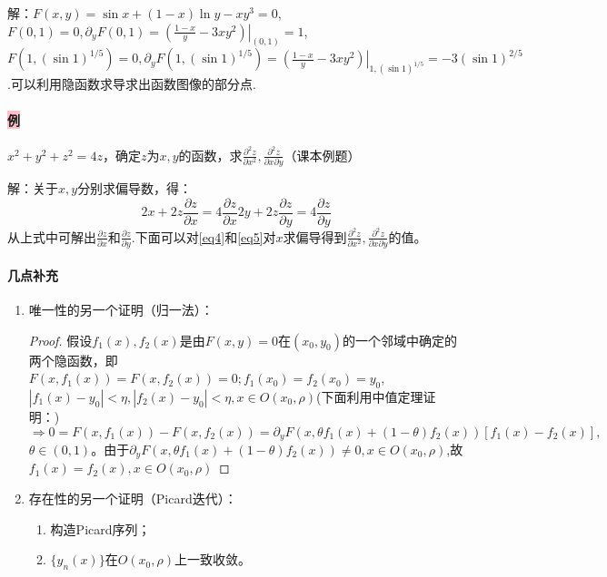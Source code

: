 \documentclass[UTF8]{ctexart}
\begin{document}
        解：$F(x,y)=\sin x+(1-x)\ln y-xy^3=0$,$F(0,1)=0,\partial_yF(0,1)=\left.\left(\frac{1-x}{y}-3xy^2\right)\right|_{(0,1)}=1$,$F(1,(\sin 1)^{1/5})=0,\partial_yF(1,(\sin 1)^{1/5})=\left.\left(\frac{1-x}{y}-3xy^2\right)\right|_{1,(\sin 1)^{1/5}}=-3(\sin 1)^{2/5}$.可以利用隐函数求导求出函数图像的部分点.
        


        \paragraph{\colorbox{pink}{例}}$x^2+y^2+z^2=4z$，确定$z$为$x,y$的函数，求$\frac{\partial^2z}{\partial x^2},\frac{\partial^2z}{\partial x\partial y}$（课本例题）

        解：关于$x,y$分别求偏导数，得：
        \begin{subequations}
            \begin{equation}
            2x+2z\frac{\partial z}{\partial x}=4\frac{\partial z}{\partial x} \label{eq4}
            \end{equation}
            \begin{equation}
            2y+2z\frac{\partial z}{\partial y}=4\frac{\partial z}{\partial y}\label{eq5}
            \end{equation}
        \end{subequations}
        从上式中可解出$\frac{\partial z}{\partial x}$和$\frac{\partial z}{\partial y}$.下面可以对\eqref{eq4}和\eqref{eq5}对$x$求偏导得到$\frac{\partial^2z}{\partial x^2},\frac{\partial^2z}{\partial x\partial y}$的值。



        \paragraph{\colorbox{orange!70}{几点补充}}
        \begin{enumerate}
            \item 唯一性的另一个证明（归一法）：
            \begin{proof}
                假设$f_1(x),f_2(x)$是由$F(x,y)=0$在$(x_0,y_0)$的一个邻域中确定的两个隐函数，即$F(x,f_1(x))=F(x,f_2(x))=0;f_1(x_0)=f_2(x_0)=y_0$,$|f_1(x)-y_0|<\eta,|f_2(x)-y_0|<\eta,x\in O(x_0,\rho)$(下面利用中值定理证明：)
                $$\Rightarrow 0=F(x,f_1(x))-F(x,f_2(x))=\partial_yF(x,\theta f_1(x)+(1-\theta)f_2(x))[f_1(x)-f_2(x)],$$
                $\theta\in(0,1)$。由于$\partial_yF(x,\theta f_1(x)+(1-\theta)f_2(x))\not=0,x\in O(x_0,\rho)$,故$f_1(x)=f_2(x),x\in O(x_0,\rho)$
            \end{proof}
            \item 存在性的另一个证明（Picard迭代）：
            \begin{enumerate}[{Step }1]
                \item 构造Picard序列；
                \item $\{y_n(x)\}$在$O(x_0,\rho)$上一致收敛。
            \end{enumerate}
        \end{enumerate}
\end{document}
